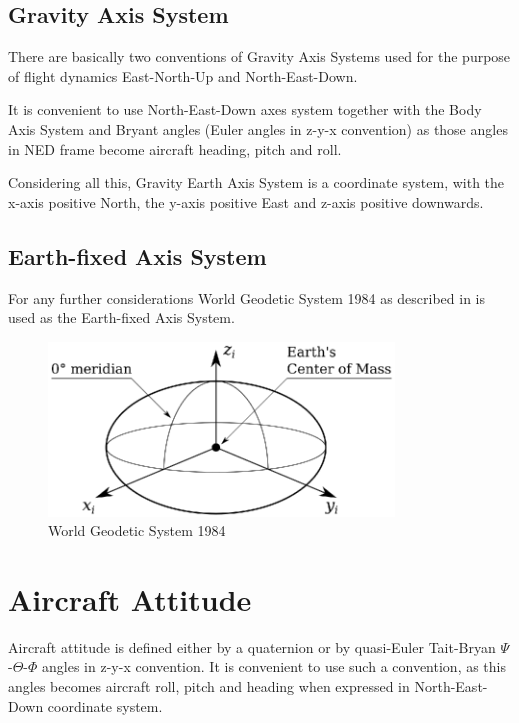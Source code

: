 \subsection{Gravity Axis System}

There are basically two conventions of Gravity Axis Systems used for the purpose of flight dynamics East-North-Up and North-East-Down.

It is convenient to use North-East-Down axes system together with the Body Axis System and Bryant angles (Euler angles in z-y-x convention) as those angles in NED frame become aircraft heading, pitch and roll.

Considering all this, Gravity Earth Axis System is a coordinate system, with the x-axis positive North, the y-axis positive East and z-axis positive downwards.

\subsection{Earth-fixed Axis System}

For any further considerations World Geodetic System 1984 as described in \cite{NIMA_WGS84} is used as the Earth-fixed Axis System.

\begin{figure}
  \centering
  \includegraphics[width=260pt]{images/coordinate_system_WGS.eps}
  \caption{World Geodetic System 1984}
\end{figure}

\section{Aircraft Attitude}

Aircraft attitude is defined either by a quaternion or by quasi-Euler Tait-Bryan $\Psi$-$\Theta$-$\Phi$ angles in z-y-x convention. It is convenient to use such a convention, as this angles becomes aircraft roll, pitch and heading when expressed in North-East-Down coordinate system.

